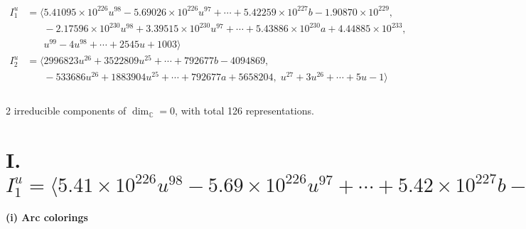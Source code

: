 \documentclass[1p]{elsarticle_modified}
\theoremstyle{definition}
\begin{document}
\begin{align*}
I^u_{1}&=\langle 
5.41095\times10^{226} u^{98}-5.69026\times10^{226} u^{97}+\cdots+5.42259\times10^{227} b-1.90870\times10^{229},\\
\phantom{I^u_{1}}&\phantom{= \langle  }-2.17596\times10^{230} u^{98}+3.39515\times10^{230} u^{97}+\cdots+5.43886\times10^{230} a+4.44885\times10^{233},\\
\phantom{I^u_{1}}&\phantom{= \langle  }u^{99}-4 u^{98}+\cdots+2545 u+1003\rangle \\
I^u_{2}&=\langle 
2996823 u^{26}+3522809 u^{25}+\cdots+792677 b-4094869,\\
\phantom{I^u_{2}}&\phantom{= \langle  }-533686 u^{26}+1883904 u^{25}+\cdots+792677 a+5658204,\;u^{27}+3 u^{26}+\cdots+5 u-1\rangle \\
\\
\end{align*}
\raggedright * 2 irreducible components of $\dim_{\mathbb{C}}=0$, with total 126 representations.\\
\newpage
\renewcommand{\arraystretch}{1}
\centering \section*{I. $I^u_{1}= \langle 5.41\times10^{226} u^{98}-5.69\times10^{226} u^{97}+\cdots+5.42\times10^{227} b-1.91\times10^{229},\;-2.18\times10^{230} u^{98}+3.40\times10^{230} u^{97}+\cdots+5.44\times10^{230} a+4.45\times10^{233},\;u^{99}-4 u^{98}+\cdots+2545 u+1003 \rangle$}
\flushleft \textbf{(i) Arc colorings}\\
\end{document}
